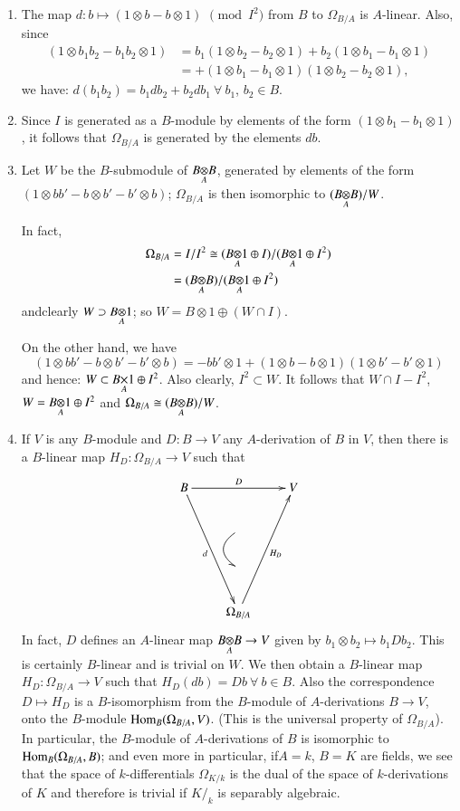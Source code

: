 \begin{enumerate}
\renewcommand{\labelenumi}{(\theenumi)}
\item The map $d:b\mapsto (1\otimes b-b\otimes 1)$ $\pmod{I^{2}}$ from
  $B$ to $\Omega_{B/A}$ is $A$-linear. Also, since
\begin{align*}
(1\otimes b_{1}b_{2}-b_{1}b_{2}\otimes 1) &= b_{1}(1\otimes
  b_{2}-b_{2}\otimes 1)+b_{2}(1\otimes b_{1}-b_{1}\otimes 1)\\
&= +(1\otimes b_{1}-b_{1}\otimes 1)(1\otimes b_{2}-b_{2}\otimes 1),
\end{align*}
we have: $d(b_{1}b_{2})=b_{1}db_{2}+b_{2}db_{1}\ \forall\ b_{1}$,
$b_{2}\in B$.

\item Since $I$ is generated as a $B$-module by elements of the form
  $(1\otimes b_{1}-b_{1}\otimes 1)$, it follows that $\Omega_{B/A}$ is
  generated by the elements $db$.

\item Let $W$ be the $B$-submodule of $\foprod{B}{B}{A}$, generated by
  elements of the form $(1\otimes bb'-b\otimes b'-b'\otimes b)$;
  $\Omega_{B/A}$ is then isomorphic to $(\foprod{B}{B}{A})/W$.

In fact,
\begin{align*}
\Omega_{B/A} &= I/I^{2}\cong (\foprod{B}{1}{A}\oplus
I)/(\foprod{B}{1}{A}\oplus I^{2})\\
&= (\foprod{B}{B}{A})/(\foprod{B}{1}{A}\oplus I^{2})
\end{align*}
and\pageoriginale clearly $W\supset \foprod{B}{1}{A}$; so $W=B\otimes
1\oplus (W\cap I)$.

On the other hand, we have
$$
(1\otimes bb'-b\otimes b'-b'\otimes b)=-bb'\otimes 1+(1\otimes
b-b\otimes 1)(1\otimes b'-b'\otimes 1)
$$
and hence: $W\subset \fprod{B}{1}{A}\oplus I^{2}$. Also clearly,
$I^{2}\subset W$. It follows that $W\cap I-I^{2}$,
$W=\foprod{B}{1}{A}\oplus I^{2}$ and $\Omega_{B/A}\cong
(\foprod{B}{B}{A})/W$.

\item If $V$ is any $B$-module and $D:B\to V$ any $A$-derivation of
  $B$ in $V$, then there is a $B$-linear map $H_{D}:\Omega_{B/A}\to V$
  such that
\[
\xymatrix{
B\ar[rr]^{D}\ar[dddr]_{d}  & & V\\
 &  \ar@/_1pc/@{-_{>}}[dlr]  & \\
 & &\\
 &  \Omega_{B/A}\ar[uuur]_{H_{D}} &
}
\]
In fact, $D$ defines an $A$-linear map $\foprod{B}{B}{A}\to V$ given by
$b_{1}\otimes b_{2}\mapsto b_{1}Db_{2}$. This is certainly $B$-linear
and is trivial on $W$. We then obtain a $B$-linear map
$H_{D}:\Omega_{B/A}\to V$ such that $H_{D}(db)=Db\ \forall\ b\in B$. Also
the correspondence $D\mapsto H_{D}$ is a $B$-isomorphism from the
$B$-module of $A$-derivations $B\to V$, onto the $B$-module
$\Hom_{B}\break (\Omega_{B/A},V)$. (This is the universal property of
$\Omega_{B/A}$). In particular, the $B$-module of $A$-derivations of
$B$ is isomorphic to $\Hom_{B}\break (\Omega_{B/A},B)$; and even more in
particular, if\pageoriginale $A=k$, $B=K$ are fields, we see that the
space of $k$-differentials $\Omega_{K/k}$ is the dual of the space of
$k$-derivations of $K$ and therefore is trivial if $K/_{k}$ is
separably algebraic. 


\end{enumerate}
